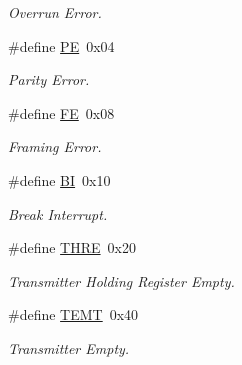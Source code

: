 \begin{DoxyCompactItemize}
\begin{DoxyCompactList}\small\item\em Overrun Error. \end{DoxyCompactList}\item 
\mbox{\label{group__i386__uart_ga211238ffe3627f42ca7b04bc96cc8fa6}} 
\#define \mbox{\hyperlink{group__i386__uart_ga211238ffe3627f42ca7b04bc96cc8fa6}{PE}}~0x04
\begin{DoxyCompactList}\small\item\em Parity Error. \end{DoxyCompactList}\item 
\mbox{\label{group__i386__uart_ga6d5652ed4a74a5609858f0949a4c4565}} 
\#define \mbox{\hyperlink{group__i386__uart_ga6d5652ed4a74a5609858f0949a4c4565}{FE}}~0x08
\begin{DoxyCompactList}\small\item\em Framing Error. \end{DoxyCompactList}\item 
\mbox{\label{group__i386__uart_gaa9ed1764c4b42e49f22c3a4f0f3b8244}} 
\#define \mbox{\hyperlink{group__i386__uart_gaa9ed1764c4b42e49f22c3a4f0f3b8244}{BI}}~0x10
\begin{DoxyCompactList}\small\item\em Break Interrupt. \end{DoxyCompactList}\item 
\mbox{\label{group__i386__uart_ga4e33b18c49f007ef1310b71325a332a5}} 
\#define \mbox{\hyperlink{group__i386__uart_ga4e33b18c49f007ef1310b71325a332a5}{T\+H\+RE}}~0x20
\begin{DoxyCompactList}\small\item\em Transmitter Holding Register Empty. \end{DoxyCompactList}\item 
\mbox{\label{group__i386__uart_gaeb9d7fbd5a3758e94acba22d266caa18}} 
\#define \mbox{\hyperlink{group__i386__uart_gaeb9d7fbd5a3758e94acba22d266caa18}{T\+E\+MT}}~0x40
\begin{DoxyCompactList}\small\item\em Transmitter Empty. \end{DoxyCompactList}\item 

\end{DoxyCompactItemize}
